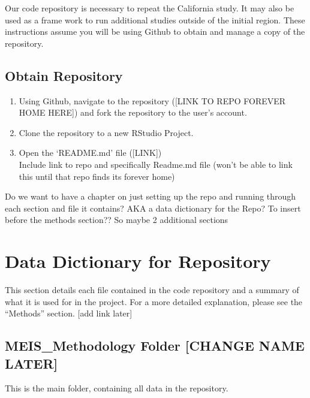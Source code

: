 \documentclass[
]{book}
\providecommand{\tightlist}{%
  \setlength{\itemsep}{0pt}\setlength{\parskip}{0pt}}
\begin{document}
Our code repository is necessary to repeat the California study. It may also be used as a frame work to run additional studies outside of the initial region. These instructions assume you will be using Github to obtain and manage a copy of the repository.

\hypertarget{obtain-repository}{%
\section{Obtain Repository}\label{obtain-repository}}

\begin{enumerate}
\def\labelenumi{\arabic{enumi}.}
\tightlist
\item
  Using Github, navigate to the repository ({[}LINK TO REPO FOREVER HOME HERE{]}) and fork the repository to the user's account.
\item
  Clone the repository to a new RStudio Project.
\item
  Open the `README.md' file ({[}LINK{]})\\
  Include link to repo and specifically Readme.md file (won't be able to link this until that repo finds its forever home)
\end{enumerate}

Do we want to have a chapter on just setting up the repo and running through each section and file it contains? AKA a data dictionary for the Repo? To insert before the methods section??
So maybe 2 additional sections

\hypertarget{data-dictionary-for-repository}{%
\chapter{Data Dictionary for Repository}\label{data-dictionary-for-repository}}

This section details each file contained in the code repository and a summary of what it is used for in the project. For a more detailed explanation, please see the ``Methods'' section. {[}add link later{]}

\hypertarget{meis_methodology-folder-change-name-later}{%
\section{MEIS\_Methodology Folder {[}CHANGE NAME LATER{]}}\label{meis_methodology-folder-change-name-later}}

This is the main folder, containing all data in the repository.
\end{document}
